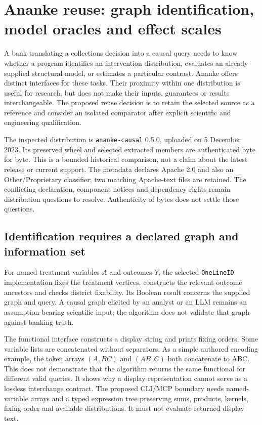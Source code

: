 \section{Ananke reuse: graph identification, model oracles and effect scales}
\label{sec:exec24-ananke-reuse}

A bank translating a collections decision into a causal query needs to know
whether a program identifies an intervention distribution, evaluates an
already supplied structural model, or estimates a particular contrast.
Ananke offers distinct interfaces for these tasks. Their proximity within
one distribution is useful for research, but does not make their inputs,
guarantees or results interchangeable. The proposed reuse decision is to
retain the selected source as a reference and consider an isolated
comparator after explicit scientific and engineering qualification.
\citep{exec24_ananke_source,exec24_ananke_choice}

The inspected distribution is \texttt{ananke-causal} 0.5.0, uploaded on
5 December 2023. Its preserved wheel and selected extracted members are
authenticated byte for byte. This is a bounded historical comparison,
not a claim about the latest release or current support. The metadata
declares Apache 2.0 and also an Other/Proprietary classifier; two matching
Apache-text files are retained. The conflicting declaration, component
notices and dependency rights remain distribution questions to resolve.
Authenticity of bytes does not settle those questions.
\citep{exec24_ananke_source}

\subsection{Identification requires a declared graph and information set}
For named treatment variables $A$ and outcomes $Y$, the selected
\texttt{OneLineID} implementation fixes the treatment vertices, constructs
the relevant outcome ancestors and checks district fixability. Its
Boolean result concerns the supplied graph and query. A causal graph
elicited by an analyst or an LLM remains an assumption-bearing scientific
input; the algorithm does not validate that graph against banking truth.
\citep{exec24_ananke_source,exec24_ananke_choice}

The functional interface constructs a display string and prints fixing
orders. Some variable lists are concatenated without separators. As a
simple authored encoding example, the token arrays $(A,BC)$ and $(AB,C)$
both concatenate to ABC. This does not demonstrate that the algorithm
returns the same functional for different valid queries. It shows why a
display representation cannot serve as a lossless interchange contract.
The proposed CLI/MCP boundary needs named-variable arrays and a typed
expression tree preserving sums, products, kernels, fixing order and
available distributions. It must not evaluate returned display text.
\citep{exec24_ananke_source,exec24_ananke_choice}

